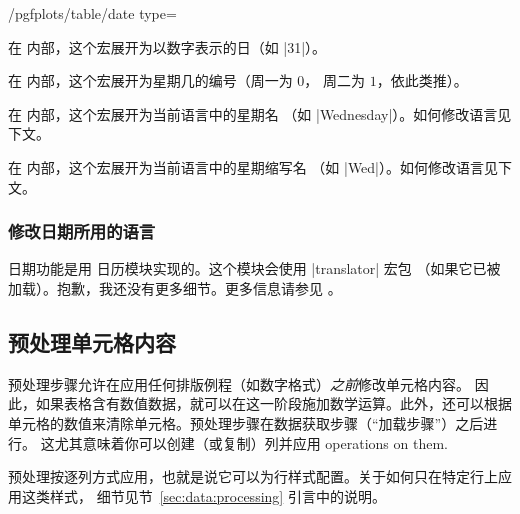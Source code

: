 \documentclass[a4paper,doc2]{ltxdoc}
\begin{document}
\begin{stylekey}{/pgfplots/table/date type=}
    \begin{command}{\day}
        在  内部，这个宏展开为以数字表示的日（如 |31|）。
    \end{command}

    \begin{command}{\weekday}
        在  内部，这个宏展开为星期几的编号（周一为 $0$，
        周二为 $1$，依此类推）。
    \end{command}

    \begin{command}{\weekdayname}
        在  内部，这个宏展开为当前语言中的星期名
        （如 |Wednesday|）。如何修改语言见下文。
    \end{command}

    \begin{command}{\weekdayshortname}
        在  内部，这个宏展开为当前语言中的星期缩写名
        （如 |Wed|）。如何修改语言见下文。
    \end{command}


    \subsubsection*{修改日期所用的语言}

    日期功能是用 \PGF{} 日历模块实现的。这个模块会使用 |translator| 宏包
    （如果它已被加载）。抱歉，我还没有更多细节。更多信息请参见 \cite{tikz}。
\end{stylekey}


\subsection{预处理单元格内容}
\label{sec:pgfplotstable:preproc}

预处理步骤允许在应用任何排版例程（如数字格式）\emph{之前}修改单元格内容。
因此，如果表格含有数值数据，就可以在这一阶段施加数学运算。此外，还可以根据
单元格的数值来清除单元格。预处理步骤在数据获取步骤（``加载步骤''）之后进行。
这尤其意味着你可以创建（或复制）列并应用
operations on them.

预处理按逐列方式应用，也就是说它可以为行样式配置。关于如何只在特定行上应用这类样式，
细节见节~\ref{sec:data:processing} 引言中的说明。
\end{document}
